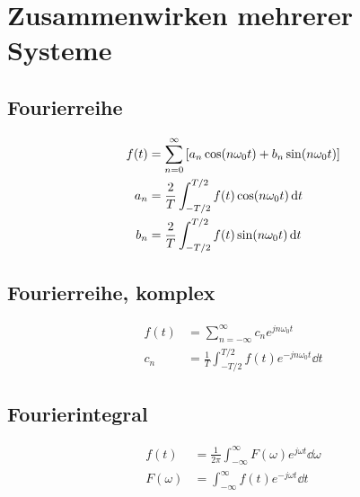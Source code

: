 \documentclass[10pt,a4paper]{article}
\begin{document}
  \section{Zusammenwirken mehrerer Systeme}
  \subsection{Fourierreihe}
  \begin{mdframed}[style=exercise]
    \begin{align}
      f(t) &= \sum_{n=0}^{\infty} \qty[a_n \cos(n \omega_0 t) + b_n \sin(n \omega_0 t)]\\
      a_n &= \frac{2}{T}\int_{-T/2}^{T/2}f(t)\cos(n\omega_0 t)\dd{t}\nonumber\\
      b_n &= \frac{2}{T}\int_{-T/2}^{T/2}f(t)\sin(n\omega_0 t)\dd{t}\nonumber
    \end{align}
  \end{mdframed}
  \pagebreak
  \subsection{Fourierreihe, komplex}
  \begin{mdframed}[style=exercise]
    \begin{align}
      f(t) &= \sum_{n=-\infty}^{\infty} c_n e^{jn\omega_0 t}\\
      c_n &= \frac{1}{T} \int_{-T/2}^{T/2} f(t) e^{-jn\omega_0 t}\dd{t}\nonumber
    \end{align}
  \end{mdframed}
  \subsection{Fourierintegral}
  \begin{mdframed}[style=exercise]
    \begin{align}
      f(t) &= \frac{1}{2\pi} \int_{-\infty}^{\infty} F(\omega) e^{j\omega t} \dd{\omega}\\
      F(\omega) &= \int_{-\infty}^{\infty} f(t) e^{-j\omega t} \dd{t}
    \end{align}
  \end{mdframed}
\end{document}
